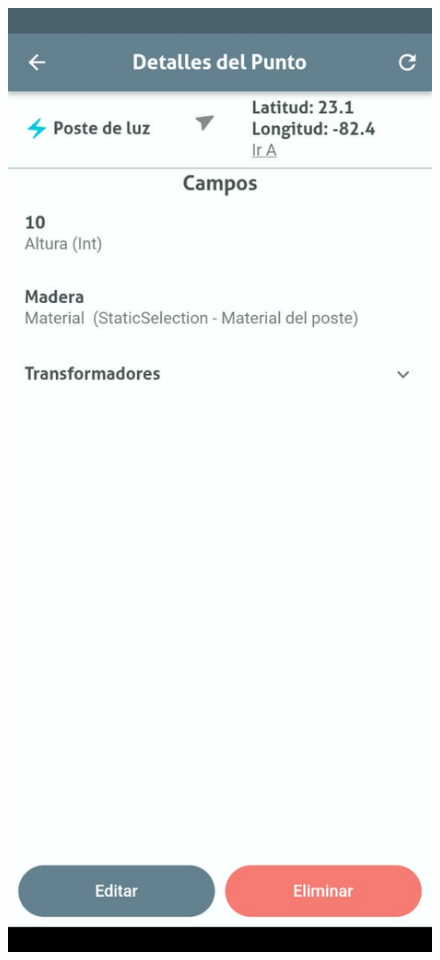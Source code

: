 \documentclass[12pt, a4paper]{book}
\begin{document}
\begin{figure}[H]
  \centering
  \begin{minipage}[b]{0.3\textwidth}
    \centering
    \includegraphics[width=\textwidth]{images/functionality_test/geodata_view1.jpg}

\end{minipage}
\end{figure}
\end{document}

